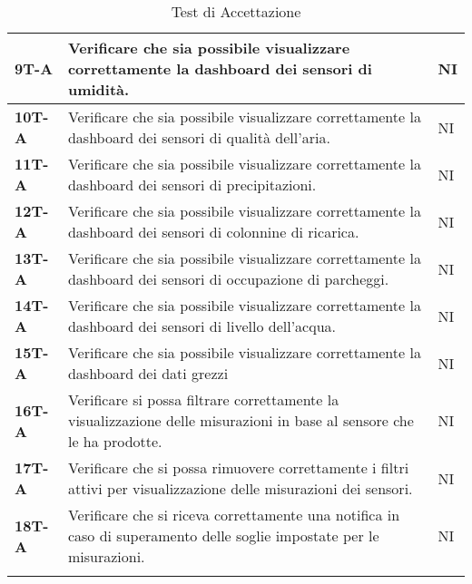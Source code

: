\begin{longtable}{|>{\raggedright\arraybackslash}m{}|>{\raggedright\arraybackslash}m{}|>{\raggedright\arraybackslash}m{}|}
	\hline
	\textbf{9T-A}   & Verificare che sia possibile visualizzare correttamente la dashboard dei sensori di umidità.                           & NI             \\
	\hline
	\textbf{10T-A}  & Verificare che sia possibile visualizzare correttamente la dashboard dei sensori di qualità dell'aria.                 & NI             \\
	\hline
	\textbf{11T-A}  & Verificare che sia possibile visualizzare correttamente la dashboard dei sensori di precipitazioni.                    & NI             \\
	\hline
	\textbf{12T-A}  & Verificare che sia possibile visualizzare correttamente la dashboard dei sensori di colonnine di ricarica.             & NI             \\
	\hline
	\textbf{13T-A}  & Verificare che sia possibile visualizzare correttamente la dashboard dei sensori di occupazione di parcheggi.          & NI             \\
	\hline
	\textbf{14T-A}  & Verificare che sia possibile visualizzare correttamente la dashboard dei sensori di livello dell'acqua.                & NI             \\
	\hline
	\textbf{15T-A}  & Verificare che sia possibile visualizzare correttamente la dashboard dei dati grezzi                                   & NI             \\
	\hline
	\textbf{16T-A}  & Verificare si possa filtrare correttamente la visualizzazione delle misurazioni in base al sensore che le ha prodotte. & NI             \\
	\hline
	\textbf{17T-A}  & Verificare che si possa rimuovere correttamente i filtri attivi per visualizzazione delle misurazioni dei sensori.     & NI             \\
	\hline
	\textbf{18T-A}  & Verificare che si riceva correttamente una notifica in caso di superamento delle soglie impostate per le misurazioni.  & NI             \\
	\hline
	\caption{Test di Accettazione}
\end{longtable}
